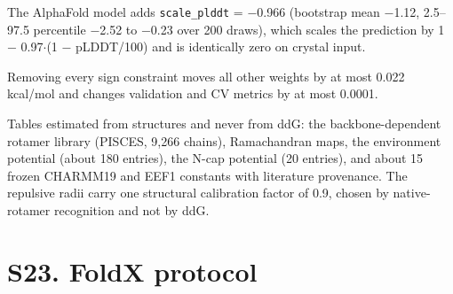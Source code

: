 \documentclass[11pt,a4paper]{article}
\begin{document}
The AlphaFold model adds \texttt{scale\_plddt} = $-$0.966 (bootstrap mean $-$1.12, 2.5--97.5 percentile $-$2.52 to $-$0.23 over
200 draws), which scales the prediction by 1 $-$ 0.97$\cdot$(1 $-$ pLDDT/100) and is identically zero on crystal input.

Removing every sign constraint moves all other weights by at most 0.022 kcal/mol and changes validation and CV
metrics by at most 0.0001.

Tables estimated from structures and never from ddG: the backbone-dependent rotamer library (PISCES, 9,266
chains), Ramachandran maps, the environment potential (about 180 entries), the N-cap potential (20 entries), and
about 15 frozen CHARMM19 and EEF1 constants with literature provenance. The repulsive radii carry one structural
calibration factor of 0.9, chosen by native-rotamer recognition and not by ddG.



\section{S23. FoldX protocol}
\end{document}
